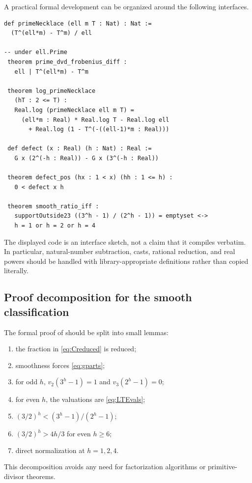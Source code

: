 \documentclass[11pt]{article}
\numberwithin{equation}{section}
\theoremstyle{definition}
\theoremstyle{remark}
\begin{document}
A practical formal development can be organized around the following interfaces.

\begin{verbatim}
def primeNecklace (ell m T : Nat) : Nat :=
  (T^(ell*m) - T^m) / ell

-- under ell.Prime
 theorem prime_dvd_frobenius_diff :
   ell | T^(ell*m) - T^m

 theorem log_primeNecklace
   (hT : 2 <= T) :
   Real.log (primeNecklace ell m T) =
     (ell*m : Real) * Real.log T - Real.log ell
       + Real.log (1 - T^(-((ell-1)*m : Real)))

 def defect (x : Real) (h : Nat) : Real :=
   G x (2^(-h : Real)) - G x (3^(-h : Real))

 theorem defect_pos (hx : 1 < x) (hh : 1 <= h) :
   0 < defect x h

 theorem smooth_ratio_iff :
   supportOutside23 ((3^h - 1) / (2^h - 1)) = emptyset <->
   h = 1 or h = 2 or h = 4
\end{verbatim}

The displayed code is an interface sketch, not a claim that it compiles verbatim.  In particular, natural-number subtraction, casts, rational reduction, and real powers should be handled with library-appropriate definitions rather than copied literally.

\subsection{Proof decomposition for the smooth classification}

The formal proof of  should be split into small lemmas:
\begin{enumerate}[label=(\arabic*)]
  \item the fraction in \eqref{eq:Creduced} is reduced;
  \item smoothness forces \eqref{eq:gparts};
  \item for odd $h$, $v_2(3^h-1)=1$ and $v_3(2^h-1)=0$;
  \item for even $h$, the valuations are \eqref{eq:LTEvals};
  \item $(3/2)^h<(3^h-1)/(2^h-1)$;
  \item $(3/2)^h>4h/3$ for even $h\ge6$;
  \item direct normalization at $h=1,2,4$.
\end{enumerate}
This decomposition avoids any need for factorization algorithms or primitive-divisor theorems.
\end{document}
